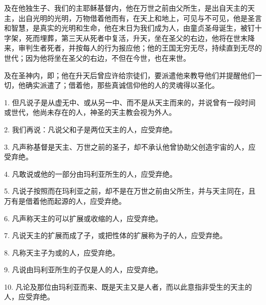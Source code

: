 及在他独生子、我们的主耶稣基督内，他在万世之前由父所生，是出自天主的天主，出自光明的光明，万物借着他而有，在天上和地上，可见与不可见，他是圣言和智慧，是真实的光明和生命，他在末日为我们成为人，由童贞圣母诞生，被钉十字架，死而埋葬，第三天从死者中复活，升天，坐在圣父的右边，他将在世末降来，审判生者死者，并按每人的行为报应他；他的王国无穷无尽，持续直到无尽的世代；因为他将坐在圣父的右边，不但在今世，也在来世。\par

及在圣神内，即；他在升天后曾应许给宗徒们，要派遣他来教导他们并提醒他们一切，他确实派遣了；借着他，那些真诚信仰他的人的灵魂得以圣化。\par

1. 但凡说子是从虚无中、或从另一中、而不是从天主而来的，并说曾有一段时间或世代，他尚未存在的人，神圣的天主教会视为外人。\par

2. 我们再说：凡说父和子是两位天主的人，应受弃绝。\par

3. 凡声称基督是天主、万世之前的圣子，却不承认他曾协助父创造宇宙的人，应受弃绝。\par

4. 凡敢说或他的一部分由玛利亚所生的人，应受弃绝。\par

5. 凡说子按照而在玛利亚之前，却不是在万世之前由父所生，并与天主同在，且万有是借着他而起源的人，应受弃绝。\par

6. 凡声称天主的可以扩展或收缩的人，应受弃绝。\par

7. 凡说天主的扩展而成了子，或把性体的扩展称为子的人，应受弃绝。\par

8. 凡称天主子为或的人，应受弃绝。\par

9. 凡说由玛利亚所生的子仅是人的人，应受弃绝。\par

10. 凡论及那位由玛利亚而来、既是天主又是人者，而以此意指非受生的天主的人，应受弃绝。\par

